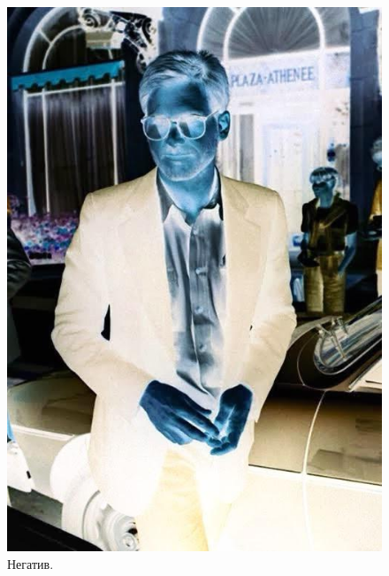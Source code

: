 \documentclass[a4paper,12pt]{article}
\begin{document}
\begin{figure}[h]
\begin{minipage}[h]{0.2\linewidth}
\includegraphics[width=1\linewidth]{Pic_Negative}
Негатив.
\end{minipage}
$\mspace{30mu}$
\begin{minipage}[h]{0.2\linewidth}

\end{minipage}
\end{figure}
\end{document}
